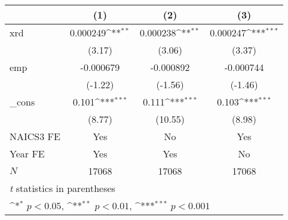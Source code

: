 {
\def\sym#1{\ifmmode^{#1}\else\(^{#1}\)\fi}
\begin{tabular}{l*{3}{c}}
\hline\hline
            &\multicolumn{1}{c}{(1)}         &\multicolumn{1}{c}{(2)}         &\multicolumn{1}{c}{(3)}         \\
\hline
xrd         &    0.000249\sym{**} &    0.000238\sym{**} &    0.000247\sym{***}\\
            &      (3.17)         &      (3.06)         &      (3.37)         \\
[1em]
emp         &   -0.000679         &   -0.000892         &   -0.000744         \\
            &     (-1.22)         &     (-1.56)         &     (-1.46)         \\
[1em]
\_cons      &       0.101\sym{***}&       0.111\sym{***}&       0.103\sym{***}\\
            &      (8.77)         &     (10.55)         &      (8.98)         \\
[1em]
NAICS3 FE   &         Yes         &          No         &         Yes         \\
[1em]
Year FE     &         Yes         &         Yes         &          No         \\
\hline
\(N\)       &       17068         &       17068         &       17068         \\
\hline\hline
\multicolumn{4}{l}{\footnotesize \textit{t} statistics in parentheses}\\
\multicolumn{4}{l}{\footnotesize \sym{*} \(p<0.05\), \sym{**} \(p<0.01\), \sym{***} \(p<0.001\)}\\
\end{tabular}
}
